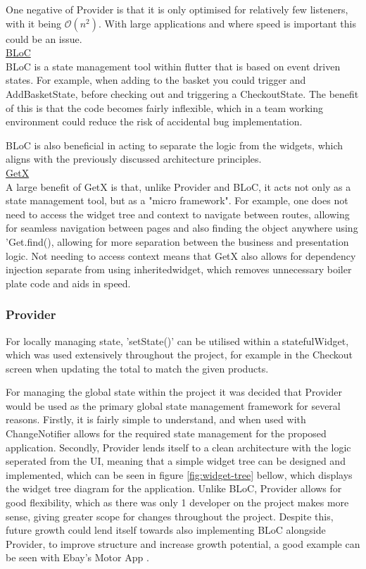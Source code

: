 \documentclass[12pt]{article}
\begin{document}
	One negative of Provider is that it is only optimised for relatively few listeners, with it being $\mathcal{O}(n^2)$. With large applications and where speed is important this could be an issue.
	\\
	
	\noindent \underline{BLoC}
	\\
	BLoC is a state management tool within flutter that is based on event driven states. For example, when adding to the basket you could trigger and AddBasketState, before checking out and triggering a CheckoutState. The benefit of this is that the code becomes fairly inflexible, which in a team working environment could reduce the risk of accidental bug implementation.
	
	BLoC is also beneficial in acting to separate the logic from the widgets, which aligns with the previously discussed architecture principles.
	\\
	

	\noindent \underline{GetX}
	\\
	\noindent
	A large benefit of GetX is that, unlike Provider and BLoC, it acts not only as a state management tool, but as a "micro framework". For example, one does not need to access the widget tree and context to navigate between routes, allowing for seamless navigation between pages and also finding the object anywhere using 'Get.find(), allowing for more separation between the business and presentation logic. Not needing to access context means that GetX also allows for dependency injection separate from using inheritedwidget, which removes unnecessary boiler plate code and aids in speed.

	
	\subsubsection{Provider}
	For locally managing state, 'setState()' can be utilised within a statefulWidget, which was used extensively throughout the project, for example in the Checkout screen when updating the total to match the given products.
	
	For managing the global state within the project it was decided that Provider would be used as the primary global state management framework for several reasons. Firstly, it is fairly simple to understand, and when used with ChangeNotifier allows for the required state management for the proposed application. Secondly, Provider lends itself to a clean architecture with the logic seperated from the UI, meaning that a simple widget tree can be designed and implemented, which can be seen in figure \ref{fig:widget-tree} bellow, which displays the widget tree diagram for the application. Unlike BLoC, Provider allows for good flexibility, which as there was only 1 developer on the project makes more sense, giving greater scope for changes throughout the project. Despite this, future growth could lend itself towards also implementing BLoC alongside Provider, to improve structure and increase growth potential, a good example can be seen with Ebay's Motor App \cite{techblogEBayMotorsState2021}.
	
\end{document}
